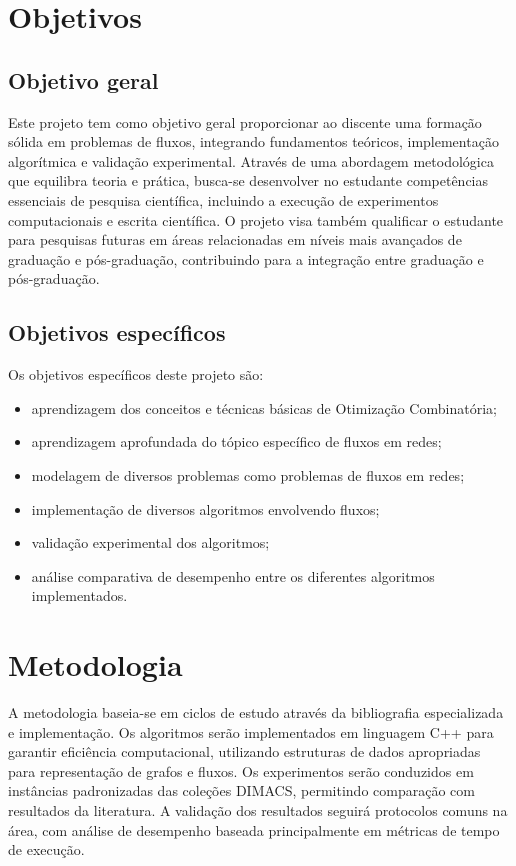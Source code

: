\documentclass{amsart}
\begin{document}
\section{Objetivos}

\subsection{Objetivo geral}
Este projeto tem como objetivo geral proporcionar ao discente uma formação sólida em problemas de fluxos, integrando fundamentos teóricos, implementação algorítmica e validação experimental. Através de uma abordagem metodológica que equilibra teoria e prática, busca-se desenvolver no estudante competências essenciais de pesquisa científica, incluindo a execução de experimentos computacionais e escrita científica. O projeto visa também qualificar o estudante para pesquisas futuras em áreas relacionadas em níveis mais avançados de graduação e pós-graduação, contribuindo para a integração entre graduação e pós-graduação.

\subsection{Objetivos específicos}
Os objetivos específicos deste projeto são:
\begin{itemize}
    \item aprendizagem dos conceitos e técnicas básicas de Otimização Combinatória;
    \item aprendizagem aprofundada do tópico específico de fluxos em redes;
    \item modelagem de diversos problemas como problemas de fluxos em redes;
    \item implementação de diversos algoritmos envolvendo fluxos;
    \item validação experimental dos algoritmos;
    \item análise comparativa de desempenho entre os diferentes algoritmos implementados.
\end{itemize}

\section{Metodologia}
A metodologia baseia-se em ciclos de estudo através da bibliografia especializada e implementação. Os algoritmos serão implementados em linguagem C++ para garantir eficiência computacional, utilizando estruturas de dados apropriadas para representação de grafos e fluxos. Os experimentos serão conduzidos em instâncias padronizadas das coleções DIMACS, permitindo comparação com resultados da literatura. A validação dos resultados seguirá protocolos comuns na área, com análise de desempenho baseada principalmente em métricas de tempo de execução.
\end{document}
